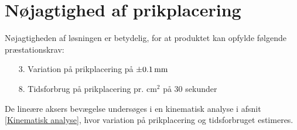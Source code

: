 \section{Nøjagtighed af prikplacering} \label{Præcision af prikplacering}

Nøjagtigheden af løsningen er betydelig, for at produktet kan opfylde følgende præstationskrav:

\begin{itemize}
    \item[3.] Variation på prikplacering på \(\SI{\pm0.1}{mm}\)
    \item[8.] Tidsforbrug på prikplacering pr. cm$^2$ på 30 sekunder
\end{itemize}

De lineære aksers bevægelse undersøges i en kinematisk analyse i afsnit \ref{Kinematisk analyse}, hvor variation på prikplacering og tidsforbruget estimeres. 



